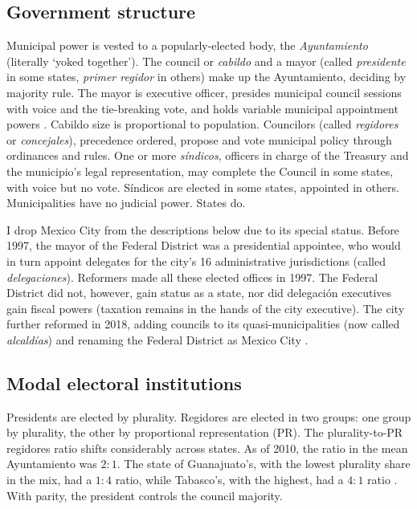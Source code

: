 \documentclass[letter,12pt]{article}
\begin{document}
\subsection{Government structure}
Municipal power is vested to a popularly-elected body, the \emph{Ayuntamiento} (literally `yoked together'). The council or \emph{cabildo} and a mayor (called \emph{presidente} in some states, \emph{primer regidor} in others) make up the Ayuntamiento, deciding by majority rule. The mayor is executive officer, presides municipal council sessions with voice and the tie-breaking vote, and holds variable municipal appointment powers \citep{robles-mtz.Municipio.2009, rmz-millan.2000}. Cabildo size is proportional to population. Councilors (called \emph{regidores} or \emph{concejales}), precedence ordered, propose and vote municipal policy through ordinances and rules. One or more \emph{síndicos}, officers in charge of the Treasury and the municipio's legal representation, may complete the Council in some states, with voice but no vote. Síndicos are elected in some states, appointed in others. Municipalities have no judicial power. States do. 

I drop Mexico City from the descriptions below due to its special status. Before 1997, the mayor of the Federal District was a presidential appointee, who would in turn appoint delegates for the city's 16 administrative jurisdictions (called \emph{delegaciones}). Reformers made all these elected offices in 1997. The Federal District did not, however, gain status as a state, nor did delegación executives gain fiscal powers (taxation remains in the hands of the city executive). The city further reformed in 2018, adding councils to its quasi-municipalities (now called \emph{alcaldías}) and renaming the Federal District as Mexico City \citep{rabell.2017}. 

\subsection{Modal electoral institutions}
Presidents are elected by plurality. Regidores are elected in two groups: one group by plurality, the other by proportional representation (PR). The plurality-to-PR regidores ratio shifts considerably across states. As of 2010, the ratio in the mean Ayuntamiento was $2:1$. The state of Guanajuato's, with the lowest plurality share in the mix, had a $1:4$ ratio, while Tabasco's, with the highest, had a $4:1$ ratio \citep[][:14]{gil.2010}. With parity, the president controls the council majority.
\end{document}
